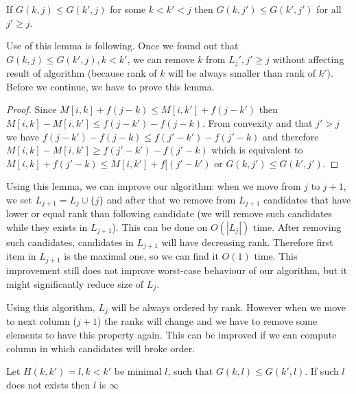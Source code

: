 \begin{lemma}\label{OneStrikeAndOut}
If $G(k,j)\leq G(k',j)$ for some $k<k'<j$ then
$G(k,j')\leq G(k',j')$ for all $j'\geq j$. 
\end{lemma}

Use of this lemma is following. Once we found out that $G(k,j)\leq
G(k',j),k<k'$, we can remove $k$ from $L_j', j'\geq j$ without affecting result
of algorithm (because rank of $k$ will be always smaller than rank of $k'$).
Before we continue, we have to prove this lemma.

\begin{proof}

Since $M[i,k]+f(j-k)\leq M[i,k']+f(j-k')$ then 
$M[i,k]-M[i,k']\leq f(j-k')-f(j-k)$. From convexity and that $j'>j$ we have
$f(j-k')-f(j-k)\leq f(j'-k')-f(j'-k)$ and therefore
$M[i,k]-M[i,k']\geq f(j'-k')-f(j'-k)$ which 
is equivalent to
$M[i,k]+f(j'-k)\leq M[i,k']+f[(j'-k')$ or $G(k,j')\leq G(k',j')$.

\end{proof}

Using this lemma, we can improve our algorithm: 
when we move from $j$ to $j+1$, we set $L_{j+1}=L_{j}\cup\{j\}$ and after that
we remove from $L_{j+1}$ candidates that have lower or equal rank than following
candidate (we will remove such candidates while they exists in $L_{j+1}$).
This can be done on $O(|L_{j}|)$ time. After removing such candidates,
candidates in $L_{j+1}$ will have decreasing rank. Therefore first item in
$L_{j+1}$ is the maximal one, so we can find it $O(1)$ time.  This improvement
still does not improve worst-case behaviour of our algorithm, but it might
significantly reduce size of $L_j$. 

Using this algorithm, $L_j$ will be always ordered by rank. However when we move
to next column ($j+1$) the ranks will change and we have to remove some elements 
to have this property again. This can be improved if we can compute column in
which  candidates will broke order.

\begin{definition}
Let $H(k,k')=l, k<k'$ be minimal $l$, such that $G(k,l)\leq G(k',l)$. If such $l$ does
not exists then $l$ is $\infty$ 
\end{definition}

